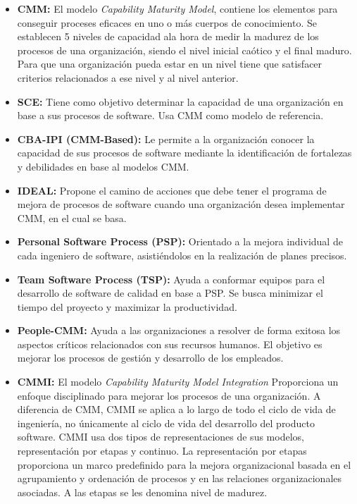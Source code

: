 \documentclass[a4paper,12pt]{article}
\begin{document}
\begin{enumerate}
 \begin{itemize}
  \item \textbf{CMM:} El modelo \textit{Capability Maturity Model}, contiene los elementos para conseguir proceses eficaces en uno o
  más cuerpos de conocimiento. Se establecen 5 niveles de capacidad ala hora de medir la madurez de los procesos de una organización, siendo el nivel inicial caótico
  y el final maduro. Para que una organización pueda estar en un nivel tiene que satisfacer criterios relacionados a ese nivel y al nivel anterior.
  \item \textbf{SCE:} Tiene como objetivo determinar la capacidad de una organización en base a sus procesos de software. Usa CMM como modelo de referencia.
  \item \textbf{CBA-IPI (CMM-Based): } Le permite a la organización conocer la capacidad de sus procesos de software mediante la identificación de fortalezas y debilidades en base al modelos CMM.
  \item \textbf{IDEAL: } Propone el camino de acciones que debe tener el programa de mejora de procesos de software cuando una organización desea implementar CMM, en el cual se basa.
  \item \textbf{Personal Software Process (PSP): } Orientado a la mejora individual de cada ingeniero de software, asistiéndolos en la realización de planes precisos.
  \item \textbf{Team Software Process (TSP): } Ayuda a conformar equipos para el desarrollo de software de calidad en base a PSP. Se busca minimizar el tiempo del proyecto y maximizar
  la productividad.
  \item \textbf{People-CMM: } Ayuda a las organizaciones a resolver de forma exitosa los aspectos críticos relacionados con sus recursos humanos. El objetivo es mejorar los procesos
  de gestión y desarrollo de los empleados.
  \item \textbf{CMMI: } El modelo \textit{Capability Maturity Model Integration} Proporciona un enfoque disciplinado para mejorar los procesos de una organización. A diferencia de CMM, CMMI se aplica a lo largo de
  todo el ciclo de vida de ingeniería, no únicamente al ciclo de vida del desarrollo del producto software. CMMI usa dos tipos de representaciones de sus modelos, representación por etapas y continuo.
  La representación por etapas proporciona un marco predefinido para la mejora organizacional basada en el agrupamiento y ordenación de procesos y en las relaciones organizacionales asociadas. A las etapas se les denomina nivel de madurez.

\end{itemize}
\end{enumerate}
\end{document}
